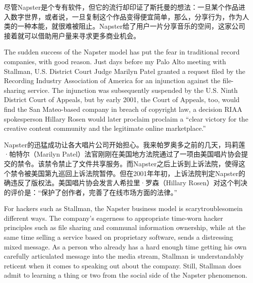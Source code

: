 \ifdefined\chs
尽管Napster是个专有软件，但它的流行却印证了斯托曼的想法：一旦某个作品进入数字世界，或者说，一旦复制这个作品变得便宜简单，那么，分享行为，作为人类的一种本能，就很难被阻止。Napster给了用户一片分享音乐的空间，这家公司接着就可以借助用户量来寻求更多商业机会。
\fi

\ifdefined\eng
The sudden success of the Napster model has put the fear in traditional record companies, with good reason. Just days before my Palo Alto meeting with Stallman, U.S. District Court Judge Marilyn Patel granted a request filed by the Recording Industry Association of America for an injunction against the file-sharing service. The injunction was subsequently suspended by the U.S. Ninth District Court of Appeals, but by early 2001, the Court of Appeals, too, would find the San Mateo-based company in breach of copyright law, a decision RIAA spokesperson Hillary Rosen would later proclaim \ifdefined\vone proclaim \fi a ``clear victory for the creative content community and the legitimate online marketplace.''
\fi

\ifdefined\chs
Napster的迅猛成功让各大唱片公司开始担心。我来帕罗奥多之前的几天，玛莉莲·帕特尔（Marilyn Patel）法官刚刚在美国地方法院通过了一项由美国唱片协会提交的禁令。该禁令禁止了文件共享服务。而Napster之后上诉到上诉法院，使得这个禁令被美国第九巡回上诉法院暂停。但在2001年年初，上诉法院判定Napster的确违反了版权法。美国唱片协会发言人希拉里·罗森（Hillary Rosen）对这个判决的评价是：``保护了创作者，完善了在线市场方面的法律。''
\fi

\ifdefined\eng
For hackers such as Stallman, the Napster business model is \ifdefined\vone scary\fi\ifdefined\vtwo troublesome\fi in different ways. The company's eagerness to appropriate time-worn hacker principles such as file sharing and communal information ownership, while at the same time selling a service based on proprietary software, sends a distressing mixed message. As a person who already has a hard enough time getting his own carefully articulated message into the media stream, Stallman is understandably reticent when it comes to speaking out about the company. Still, Stallman does admit to learning a thing or two from the social side of the Napster phenomenon.
\fi


